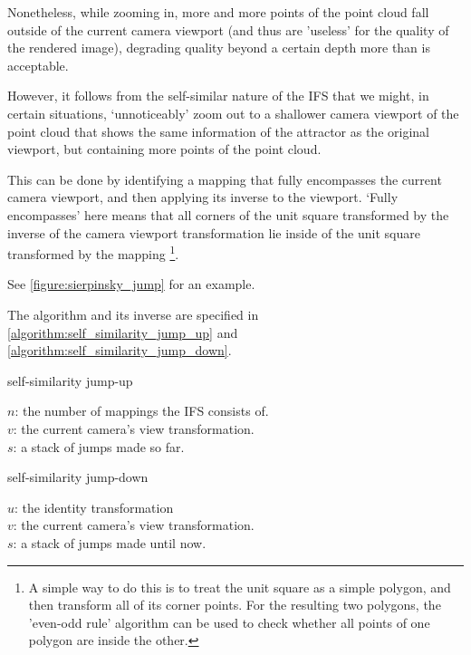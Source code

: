 \documentclass[11pt]{article}
\begin{document}
Nonetheless, while zooming in, more and more points of the point cloud fall outside of the current camera viewport
(and thus are 'useless' for the quality of the rendered image), degrading quality beyond a certain depth more than is acceptable.

However, it follows from the self-similar nature of the IFS that we might, in certain situations,
`unnoticeably' zoom out to a shallower camera viewport of the point cloud that shows the same information of the attractor
as the original viewport, but containing more points of the point cloud.

This can be done by identifying a mapping that fully encompasses the current camera viewport, and then applying its inverse
to the viewport.
`Fully encompasses' here means that 
all corners of the unit square transformed by the inverse of the camera viewport transformation
lie inside of the unit square transformed by the mapping \footnote{A simple way to do this is to treat the unit square as a simple polygon,
and then transform all of its corner points. For the resulting two polygons, the 'even-odd rule' algorithm
\cite{haines1994point}
can be used to check whether all points of one polygon are inside the other.}.

See \autoref{figure:sierpinsky_jump} for an example. 

The algorithm and its inverse are specified in \autoref{algorithm:self_similarity_jump_up} and \autoref{algorithm:self_similarity_jump_down}.

\begin{algorithm}
\caption{self-similarity jump-up}
\label{algorithm:self_similarity_jump_up}
  $n$: the number of mappings the IFS consists of. \\
  $v$: the current camera's view transformation. \\
  $s$: a stack of jumps made so far. \\
\end{algorithm}

\begin{algorithm}
\caption{self-similarity jump-down}
\label{algorithm:self_similarity_jump_down}
  $u$: the identity transformation \\
  $v$: the current camera's view transformation. \\
  $s$: a stack of jumps made until now. \\
\end{algorithm}
\end{document}
